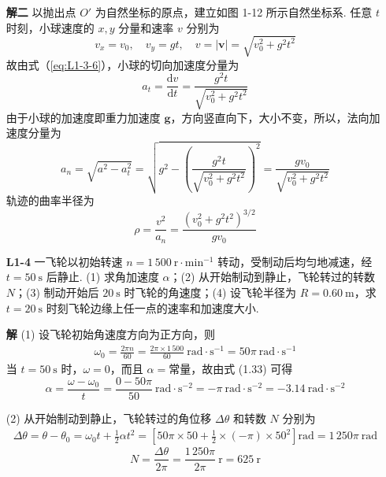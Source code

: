 \begin{enumerate}
	\textbf{解二} \quad 以抛出点 $O'$ 为自然坐标的原点，建立如图 1-12 所示自然坐标系. 任意 $t$ 时刻，小球速度的 $x, y$ 分量和速率 $v$ 分别为
	\begin{equation}\label{eq:L1-3-6}
		v_x = v_0, \quad v_y = gt, \quad v = |\boldsymbol{v}| = \sqrt{v_0^2 + g^2 t^2}
	\end{equation}
	故由式（\ref{eq:L1-3-6}），小球的切向加速度分量为
	\begin{equation}\label{eq:L1-3-7}
		a_t = \frac{\mathrm{d}v}{\mathrm{d}t} = \frac{g^2 t}{\sqrt{v_0^2 + g^2 t^2}}
	\end{equation}
	由于小球的加速度即重力加速度 $\boldsymbol{g}$，方向竖直向下，大小不变，所以，法向加速度分量为
	\begin{equation}\label{eq:L1-3-8}
		a_n = \sqrt{a^2 - a_t^2} = \sqrt{g^2 - \left( \frac{g^2 t}{\sqrt{v_0^2 + g^2 t^2}} \right)^2} = \frac{g v_0}{\sqrt{v_0^2 + g^2 t^2}}
	\end{equation}
	轨迹的曲率半径为
	\begin{equation}\label{eq:L1-3-9}
		\rho = \frac{v^2}{a_n} = \frac{\left(v_0^2 + g^2 t^2\right)^{3/2}}{g v_0}
	\end{equation}
	
	\vspace{2em}
	
	\item [\textbf{L1-4}]
	\setcounter{equation}{0}
	\renewcommand{\theHequation}{L1-4.\arabic{equation}}
	\quad 一飞轮以初始转速 $n = 1\,500 \mathrm{\ r \cdot min^{-1}}$ 转动，受制动后均匀地减速，经 $t = 50 \mathrm{\ s}$ 后静止. (1) 求角加速度 $\alpha$；(2) 从开始制动到静止，飞轮转过的转数 $N$；(3) 制动开始后 $20 \mathrm{\ s}$ 时飞轮的角速度；(4) 设飞轮半径为 $R = 0.60 \mathrm{\ m}$，求 $t = 20 \mathrm{\ s}$ 时刻飞轮边缘上任一点的速率和加速度大小.
	
	\textbf{解} \quad (1) 设飞轮初始角速度方向为正方向，则
	\begin{align*}
		\omega_0 = \frac{2\pi n}{60} = \frac{2\pi \times 1\,500}{60} \mathrm{\ rad \cdot s^{-1}} = 50\pi \mathrm{\ rad \cdot s^{-1}}
	\end{align*}
	当 $t = 50 \mathrm{\ s}$ 时，$\omega = 0$，而且 $\alpha = \text{常量}$，故由式 (1.33) 可得
	\begin{equation}\label{eq:L1-4-1}
		\alpha = \frac{\omega - \omega_0}{t} = \frac{0 - 50\pi}{50} \mathrm{\ rad \cdot s^{-2}} = -\pi \mathrm{\ rad \cdot s^{-2}} = -3.14 \mathrm{\ rad \cdot s^{-2}}
	\end{equation}
	
	(2) 从开始制动到静止，飞轮转过的角位移 $\Delta\theta$ 和转数 $N$ 分别为
	\begin{align*}
		\Delta\theta = \theta - \theta_0 = \omega_0 t + \frac{1}{2}\alpha t^2 = \left[ 50\pi \times 50 + \frac{1}{2} \times (-\pi) \times 50^2 \right] \mathrm{rad} = 1\,250\pi \mathrm{\ rad}
	\end{align*}
	\begin{equation}\label{eq:L1-4-2}
		N = \frac{\Delta\theta}{2\pi} = \frac{1\,250\pi}{2\pi} \mathrm{\ r} = 625 \mathrm{\ r}
	\end{equation}
	

\end{enumerate}

